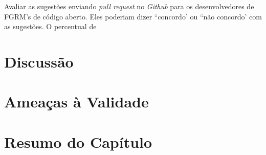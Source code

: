Avaliar as sugestões enviando \textit{pull request} no \textit{Github} para os
desenvolvedores de FGRM's de código aberto. Eles poderiam dizer ``concordo' ou
``não concordo' com as sugestões. O percentual de

\section{Discussão}
\label{sec:sug_melhoria_discussao}

\section{Ameaças à Validade}
\label{sec:sug_melhoria_ameacas}

\section{Resumo do Capítulo}
\label{sec:sug_melhoria_resumo}
